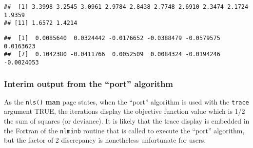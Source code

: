 \documentclass[
]{article}
\newenvironment{Shaded}{\begin{snugshade}}{\end{snugshade}}
\newcommand{\AttributeTok}[1]{\textcolor[rgb]{0.77,0.63,0.00}{#1}}
\newcommand{\CommentTok}[1]{\textcolor[rgb]{0.56,0.35,0.01}{\textit{#1}}}
\newcommand{\DecValTok}[1]{\textcolor[rgb]{0.00,0.00,0.81}{#1}}
\newcommand{\FunctionTok}[1]{\textcolor[rgb]{0.00,0.00,0.00}{#1}}
\newcommand{\NormalTok}[1]{#1}
\newcommand{\OtherTok}[1]{\textcolor[rgb]{0.56,0.35,0.01}{#1}}
\newcommand{\SpecialCharTok}[1]{\textcolor[rgb]{0.00,0.00,0.00}{#1}}
\newcommand{\StringTok}[1]{\textcolor[rgb]{0.31,0.60,0.02}{#1}}
\begin{document}
\begin{Shaded}
\end{Shaded}

\begin{verbatim}
##  [1] 3.3998 3.2545 3.0961 2.9784 2.8438 2.7748 2.6910 2.3474 2.1724 1.9359
## [11] 1.6572 1.4214
\end{verbatim}

\begin{Shaded}
\end{Shaded}

\begin{verbatim}
##  [1]  0.0085640  0.0324442 -0.0176652 -0.0388479 -0.0579575  0.0163623
##  [7]  0.1042380 -0.0411766  0.0052509  0.0084324 -0.0194246 -0.0024053
\end{verbatim}

\hypertarget{interim-output-from-the-port-algorithm}{%
\subsubsection{Interim output from the ``port''
algorithm}\label{interim-output-from-the-port-algorithm}}

As the \texttt{nls()} \textbf{man} page states, when the ``port''
algorithm is used with the \texttt{trace} argument TRUE, the iterations
display the objective function value which is 1/2 the sum of squares (or
deviance). It is likely that the trace display is embedded in the
Fortran of the \texttt{nlminb} routine that is called to execute the
``port'' algorithm, but the factor of 2 discrepancy is nonetheless
unfortunate for users.
\end{document}
